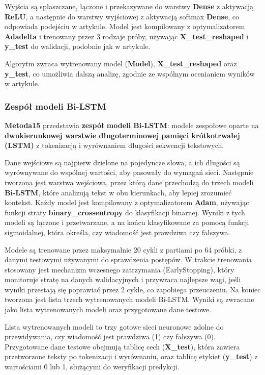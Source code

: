 Wyjścia są spłaszczane, łączone i przekazywane do warstwy \textbf{Dense} z aktywacją \textbf{ReLU}, a następnie do warstwy wyjściowej z aktywacją softmax \textbf{Dense}, co odpowiada podejściu w artykule. Model jest kompilowany z optymalizatorem \textbf{Adadelta} i trenowany przez 3 rodzaje próby, używając \textbf{X\_test\_reshaped} i \textbf{y\_test} do walidacji, podobnie jak w artykule.

Algorytm zwraca wytrenowany model (\textbf{Model}), \textbf{X\_test\_reshaped} oraz \textbf{y\_test}, co umożliwia dalszą analizę, zgodnie ze wspólnym ocenianiem wyników w artykule.

\subsubsection{Zespół modeli Bi-LSTM}
\textbf{Metoda15} przedstawia \textbf{zespół modeli Bi-LSTM}: modele zespołowe oparte na \textbf{dwukierunkowej warstwie długoterminowej pamięci krótkotrwałej (LSTM)} z tokenizacją i wyrównaniem długości sekwencji tekstowych.

Dane wejściowe są najpierw dzielone na pojedyncze słowa, a ich długości są wyrównywane do wspólnej wartości, aby pasowały do wymagań sieci. Następnie tworzona jest warstwa wejściowa, przez którą dane przechodzą do trzech modeli \textbf{Bi-LSTM}, które analizują tekst w obu kierunkach, aby lepiej zrozumieć kontekst. Każdy model jest kompilowany z optymalizatorem \textbf{Adam}, używając funkcji straty \textbf{binary\_crossentropy} do klasyfikacji binarnej. Wyniki z tych modeli są łączone i przetwarzane, a na końcu klasyfikowane za pomocą funkcji sigmoidalnej, która określa, czy wiadomość jest prawdziwa czy fałszywa.

Modele są trenowane przez maksymalnie 20 cykli z partiami po 64 próbki, z danymi testowymi używanymi do sprawdzenia postępów. W trakcie trenowania stosowany jest mechanizm wczesnego zatrzymania (EarlyStopping), który monitoruje stratę na danych walidacyjnych i przywraca najlepsze wagi, jeśli wyniki przestają się poprawiać przez 2 cykle, co zapobiega przeuczeniu. Na koniec tworzona jest lista trzech wytrenowanych modeli Bi-LSTM. Wyniki są zwracane jako lista wytrenowanych modeli oraz przygotowane dane testowe.

Lista wytrenowanych modeli to trzy gotowe sieci neuronowe zdolne do przewidywania, czy wiadomość jest prawdziwa (1) czy fałszywa (0). Przygotowane dane testowe obejmują tablicę cech (\textbf{X\_test}), która zawiera przetworzone teksty po tokenizacji i wyrównaniu, oraz tablicę etykiet (\textbf{y\_test}) z wartościami 0 lub 1, służącymi do weryfikacji predykcji.


